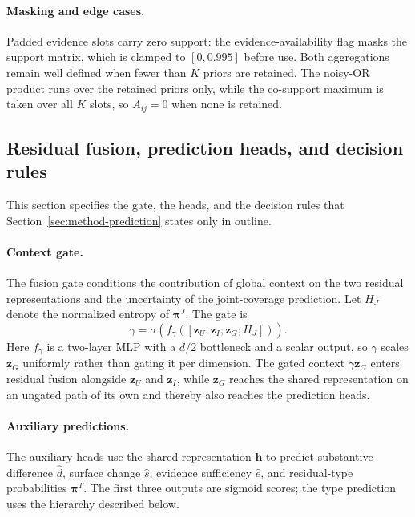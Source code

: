 \paragraph{Masking and edge cases.}
Padded evidence slots carry zero support: the evidence-availability flag masks
the support matrix, which is clamped to $[0,0.995]$ before use. Both
aggregations remain well defined when fewer than $K$ priors are retained. The
noisy-OR product runs over the retained priors only, while the co-support
maximum is taken over all $K$ slots, so $\bar{A}_{ij}=0$ when none is
retained.

\subsection{Residual fusion, prediction heads, and decision rules}
\label{app:method-heads}

This section specifies the gate, the heads, and the decision rules that
Section~\ref{sec:method-prediction} states only in outline.

\paragraph{Context gate.}
The fusion gate conditions the contribution of global context on the two
residual representations and the uncertainty of the joint-coverage
prediction. Let $H_J$ denote the normalized entropy of
$\boldsymbol{\pi}^{J}$. The gate is
\begin{equation}
 \gamma=\sigma\left(f_\gamma([
 \boldsymbol{z}_U;\boldsymbol{z}_I;\boldsymbol{z}_G;H_J])\right).
\end{equation}
Here $f_\gamma$ is a two-layer MLP with a $d/2$ bottleneck and a scalar
output, so $\gamma$ scales $\boldsymbol{z}_G$ uniformly rather than gating it
per dimension. The gated context $\gamma\boldsymbol{z}_G$ enters residual
fusion alongside $\boldsymbol{z}_U$ and $\boldsymbol{z}_I$, while
$\boldsymbol{z}_G$ reaches the shared representation on an ungated path of
its own and thereby also reaches the prediction heads.

\paragraph{Auxiliary predictions.}
The auxiliary heads use the shared representation $\boldsymbol{h}$ to predict
substantive difference $\widehat d$, surface change $\widehat s$, evidence
sufficiency $\widehat e$, and residual-type probabilities
$\boldsymbol{\pi}^{T}$. The first three outputs are sigmoid scores; the type
prediction uses the hierarchy described below.

